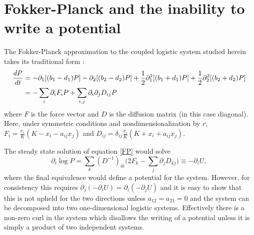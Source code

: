 \section{Fokker-Planck and the inability to write a potential}
The Fokker-Planck approximation to the coupled logistic system studied herein takes its traditional form \cite{Nisbet1982}:
\begin{align}
\frac{dP}{dt} &= - \partial_1[(b_1-d_1)P] - \partial_2[(b_2-d_2)P] + \frac{1}{2}\partial_1^2[(b_1+d_1)P] + \frac{1}{2}\partial_2^2[(b_2+d_2)P] \notag \\
&= -\sum_{i} \partial_i F_iP + \sum_{i,j} \partial_i\partial_j D_{ij}P \label{FP}
\end{align}%
where $F$ is the force vector and $D$ is the diffusion matrix (in this case diagonal). 
Here, under symmetric conditions and nondimensionalization by $r$, $F_i = \frac{x_i}{K}(K - x_i - a_{ij}x_j)$ and $D_{ij} = \delta_{ij}\frac{x_i}{K}(K + x_i + a_{ij}x_j)$. 
\iffalse
We want to write these force terms using a scalar potential, $F=-\nabla U$. %
If this were possible, it would imply that $\nabla \times F = -\nabla \times \nabla U = 0$. 
However,%
\begin{align*}
|\nabla \times F| &= |\partial_1 F_2 - \partial_2 F_1| \\
&= |-a_{21}x_2/K + a_{12}x_1/K| \\
&\neq 0.
\end{align*}
\fi
The steady state solution of equation \ref{FP} would solve
\begin{equation*}
\partial_i \log P = \sum_k (D^{-1})_{ik} \big( 2 F_k - \sum_j \partial_j D_{kj} \big) \equiv - \partial_i U,
\end{equation*}
where the final equivalence would define a potential for the system. 
However, for consistency this requires $\partial_j \left( - \partial_i U \right) = \partial_i \left( - \partial_j U \right)$ and it is easy to show that this is not upheld for the two directions unless $a_{12}=a_{21}=0$ and the system can be decomposed into two one-dimensional logistic systems. 
Effectively there is a non-zero curl in the system which disallows the writing of a potential unless it is simply a product of two independent systems. 


